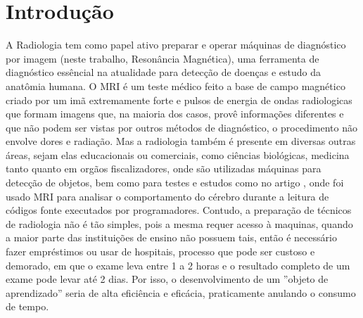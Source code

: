 \documentclass[12pt,openright,oneside,a4paper,english,french,spanish,brazil]{unifil}
\begin{document}

\tableofcontents*

  \setlength\absleftindent{0cm}
  \setlength\absrightindent{0cm}
  
  \abstracttextfont{\normalfont\normalsize}

  \setlength{\absparindent}{0pt}
  \setlength{\absparsep}{18pt}


\textual

\renewcommand{\ABNTEXchapterfont}{\fontfamily{cmr}\fontseries{b}\selectfont}
\renewcommand{\ABNTEXchapterfontsize}{\Large}

\renewcommand{\ABNTEXsectionfont}{\uppercase{\fontfamily{cmr}\fontseries{b}\selectfont}}
\renewcommand{\ABNTEXsectionfontsize}{\large}

\chapter{Introdução}

A Radiologia tem como papel ativo preparar e operar máquinas de diagnóstico por imagem (neste trabalho, Resonância Magnética), uma ferramenta de diagnóstico essêncial na atualidade para detecção de doenças e estudo da anatômia humana. O MRI é um teste médico feito a base de campo magnético criado por um imã extremamente forte e pulsos de energia de ondas radiologicas que formam imagens que, na maioria dos casos, provê informações diferentes e que não podem ser vistas por outros métodos de diagnóstico, o procedimento não envolve dores e radiação. Mas a radiologia também é presente em diversas outras áreas, sejam elas educacionais ou comerciais, como ciências biológicas, medicina tanto quanto em orgãos fiscalizadores, onde são utilizadas máquinas para detecção de objetos, bem como para testes e estudos como no artigo \citeyear{Siegmund:2014}, onde foi usado MRI para analisar o comportamento do cérebro durante a leitura de códigos fonte executados por programadores. Contudo, a preparação de técnicos de radiologia não é tão simples, pois a mesma requer acesso à maquinas, quando a maior parte das instituições de ensino não possuem tais, então é necessário fazer empréstimos ou usar de hospitais, processo que pode ser custoso e demorado, em que o exame leva entre 1 a 2 horas e o resultado completo de um exame pode levar até 2 dias. Por isso, o desenvolvimento de um ''objeto de aprendizado'' seria de alta eficiência e eficácia, praticamente anulando o consumo de tempo.
\end{document}
